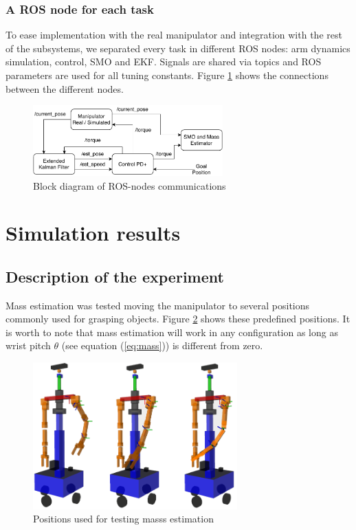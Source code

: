 \documentclass[a4paper, 10pt]{article}
\begin{document}
\subsubsection*{A ROS node for each task}
To ease implementation with the real manipulator and integration with the rest of the subsystems, we separated every task in different ROS nodes: arm dynamics simulation, control, SMO and EKF. Signals are shared via topics and ROS parameters are used for all tuning constants. Figure \ref{fig:RosNodes} shows the connections between the different nodes. 
\begin{figure}
  \centering
  \includegraphics[width=0.65\textwidth]{Figures/RosNodes.pdf}
  \caption{Block diagram of ROS-nodes communications}
  \label{fig:RosNodes}
\end{figure}


\section{Simulation results}
\label{sec:results}
\subsection{Description of the experiment}
Mass estimation was tested moving the manipulator to several positions commonly used for grasping objects. Figure \ref{fig:test_poses} shows these predefined positions. It is worth to note that mass estimation will work in any configuration as long as wrist pitch $\theta$ (see equation (\ref{eq:mass})) is different from zero. 
\begin{figure}
  \centering
  \includegraphics[width=0.7\textwidth]{Figures/test_poses.png}
  \caption{Positions used for testing masss estimation}
  \label{fig:test_poses}
\end{figure}
\end{document}
